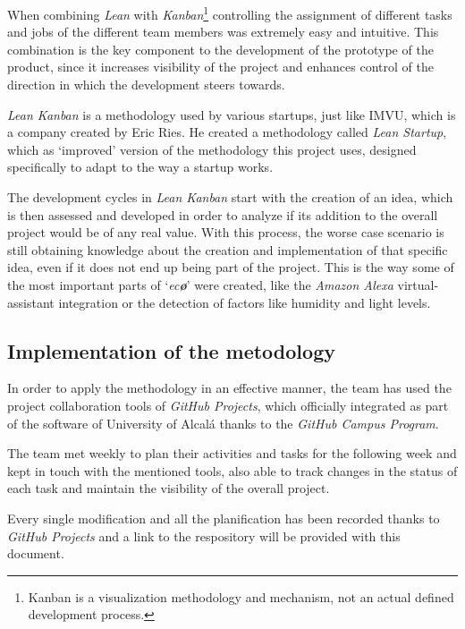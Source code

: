 \documentclass[english,runningheads,a4paper]{llncs}[2018/03/10]
\begin{document}
When combining \textit{Lean} with \textit{Kanban}\footnote{Kanban is a
visualization methodology and mechanism, not an actual defined development
process.} controlling the assignment of different tasks and jobs of the
different team members was extremely easy and intuitive. This combination is the
key component to the development of the prototype of the product, since it
increases visibility of the project and enhances control of the direction in
which the development steers towards.

\textit{Lean Kanban} is a methodology used by various startups, just like IMVU,
which is a company created by Eric Ries. He created a methodology called
\textit{Lean Startup}, which as `improved' version of the methodology this
project uses, designed specifically to adapt to the way a startup works.

The development cycles in \textit{Lean Kanban} start with the creation of an
idea, which is then assessed and developed in order to analyze if its addition
to the overall project would be of any real value. With this process, the worse
case scenario is still obtaining knowledge about the creation and implementation
of that specific idea, even if it does not end up being part of the project.
This is the way some of the most important parts of `\textit{ec\textbf{\o}}'
were created, like the \textit{Amazon Alexa} virtual-assistant integration or
the detection of factors like humidity and light levels.


    \subsection*{Implementation of the metodology}

    In order to apply the methodology in an effective manner, the team has used
    the project collaboration tools of \textit{GitHub Projects}, which
    officially integrated as part of the software of University of Alcalá thanks
    to the \textit{GitHub Campus Program}.

    The team met weekly to plan their activities and tasks for the following
    week and kept in touch with the mentioned tools, also able to track changes
    in the status of each task and maintain the visibility of the overall
    project.

    Every single modification and all the planification has been recorded thanks
    to \textit{GitHub Projects} and a link to the respository will be provided
    with this document.
\end{document}
